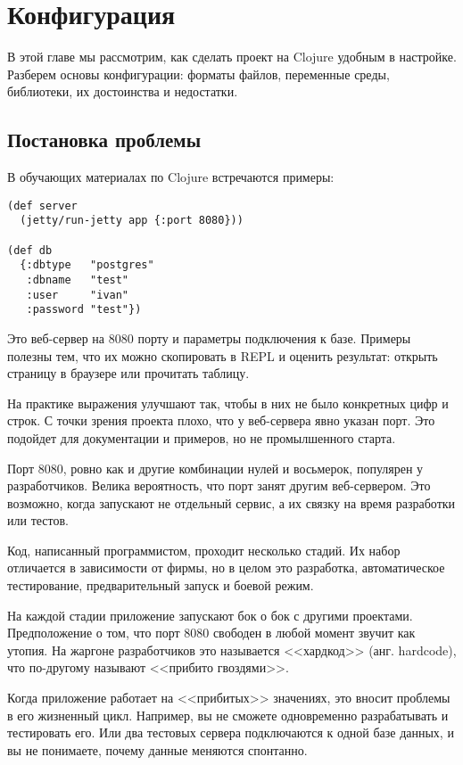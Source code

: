 \chapter{Конфигурация}

\begin{teaser}
В этой главе мы рассмотрим, как сделать проект на Clojure удобным в
настройке. Разберем основы конфигурации: форматы файлов, переменные среды,
библиотеки, их достоинства и недостатки.
\end{teaser}

\section{Постановка проблемы}

В обучающих материалах по Clojure встречаются примеры:

\begin{verbatim}
(def server
  (jetty/run-jetty app {:port 8080}))

(def db
  {:dbtype   "postgres"
   :dbname   "test"
   :user     "ivan"
   :password "test"})
\end{verbatim}

Это веб-сервер на 8080 порту и параметры подключения к базе. Примеры полезны
тем, что их можно скопировать в REPL и оценить результат: открыть страницу в
браузере или прочитать таблицу.

На практике выражения улучшают так, чтобы в них не было конкретных цифр и
строк. С точки зрения проекта плохо, что у веб-сервера явно указан порт. Это
подойдет для документации и примеров, но не промылшенного старта.

Порт 8080, ровно как и другие комбинации нулей и восьмерок, популярен у
разработчиков. Велика вероятность, что порт занят другим веб-сервером. Это
возможно, когда запускают не отдельный сервис, а их связку на время разработки
или тестов.

Код, написанный программистом, проходит несколько стадий. Их набор отличается в
зависимости от фирмы, но в целом это разработка, автоматическое тестирование,
предварительный запуск и боевой режим.

На каждой стадии приложение запускают бок о бок с другими
проектами. Предположение о том, что порт 8080 свободен в любой момент звучит как
утопия. На жаргоне разработчиков это называется <<хардкод>> (анг. hardcode), что
по-другому называют <<прибито гвоздями>>.

Когда приложение работает на <<прибитых>> значениях, это вносит проблемы в его
жизненный цикл. Например, вы не сможете одновременно разрабатывать и тестировать
его. Или два тестовых сервера подключаются к одной базе данных, и вы не
понимаете, почему данные меняются спонтанно.

